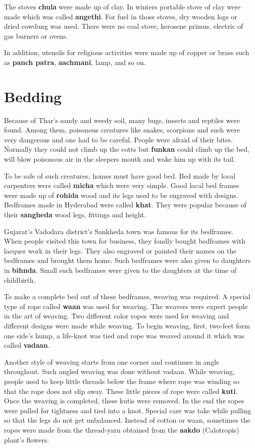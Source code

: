 The stoves \textbf{chula} were made up of clay. In winters portable stove of
clay were made which was called \textbf{angethi}. For fuel in those stoves, dry
wooden logs or dried cowdung was used. There were no coal stove, kerosene
primus, electric of gas burners or ovens.

In addition, utensils for religious activities were made up of copper or brass
such as \textbf{panch patra}, \textbf{aachmani}, lamp, and so on.

\section{Bedding}
Because of Thar's sandy and weedy soil, many bugs, insects and reptiles were
found. Among them, poisonous creatures like snakes, scorpions and such were very
dangerous and one had to be careful. People were afraid of their bites. Normally
they could not climb up the cotts but \textbf{funkan} could climb up the bed,
will blow poisonous air in the sleepers mouth and wake him up with its tail.

To be safe of such creatures, homes must have good bed. Bed made by local
carpenters were called \textbf{micha} which were very simple. Good local bed
frames were made up of \textbf{rohida} wood and its legs used to be engraved with
designs. Bedframes made in Hyderabad were called \textbf{khat}. They were popular
because of their \textbf{sangheda} wood legs, fittings and height.

Gujarat's Vadodara district's Sankheda town was famous for its bedframes. When
people visited this town for business, they fondly bought bedframes with lacquer
work in their legs. They also engraved or painted their names on the bedframes and
brought them home. Such bedframes were also given to daughters in \textbf{bihnda}.
Small such bedframes were given to the daughters at the time of childbirth.

To make a complete bed out of these bedframes, weaving was required. A special
type of rope called \textbf{waan} was used for weaving. The weavers were expert
people in the art of weaving. Two different color ropes were used for weaving
and different designs were made while weaving. To begin weaving, first, two-feet form one
side's hump, a life-knot was tied and rope was weaved around it which was called
\textbf{vadaan}.

Another style of  weaving starts from one corner and continues in angle throughout. Such
angled weaving was done without vadaan. While weaving, people used to keep
little threads below the frame where rope was winding so that the rope does not
slip away. These little pieces of rope were called \textbf{kuti}. Once the
weaving is completed, these kutis were removed. In the end the ropes were pulled
for tightness and tied into a knot. Special care was take while pulling so that
the legs do not get unbalanced. Instead of cotton or waan, sometimes the ropes
were made from the thread-yarn obtained from the \textbf{aakdo} (Calotropis) plant's flowers.

